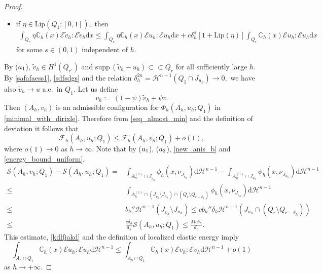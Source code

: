 \documentclass[reqno]{amsart}
\numberwithin{equation}{section}
\theoremstyle{plain}
\theoremstyle{definition}
\newcommand{\C}{\mathbb{C}}
\newcommand{\cH}{\mathcal{H}}
\newcommand{\cS}{\mathcal{S}}
\newcommand{\cF}{\mathcal{F}}
\renewcommand{\d}{\mathrm{d}}
\newcommand{\strictlyincluded}{\subset\subset}
\renewcommand{\tilde}{\widetilde}
\newcommand{\supp}{\mathrm{supp}\,}
\newcommand{\Lip}{\mathrm{Lip}}
\newcommand{\str}[1]{\mathcal{E}#1}
\begin{document}
\begin{proof}
\begin{itemize}
\item[($\rm a_4$)] if $\eta\in \Lip(Q_1;[0,1]),$ then 
\begin{align}\label{eta_constant}
\int_{Q_r} \eta \C_h(x)\str{\tilde v_h}:  \str{\tilde v_h}\d x \le
\int_{Q_r} \eta \C_h(x)\str{u_h}:\str{u_h} \d x
+
c\delta_h^s[1+\Lip(\eta)]\int_{Q_r} \C_h(x)\str{u_h}:\str{u_h}\d x 
\end{align}
for some $s\in(0,1)$ independent of $h.$ 
\end{itemize}
%
By ($\rm a_1$), $\tilde v_h\in H^1 (Q_{r'} )$ and $\supp(\tilde v_h - u_h)\strictlyincluded Q_r$ for all sufficiently  large $h.$
By \eqref{safafaess1}, \eqref{sdfsdgs} and the relation $\delta_h^{2n}=\cH^{n-1}(Q_1\cap J_{u_h})\to0,$ we have also
$\tilde v_h\to u$ a.e.\  in $Q_1.$  Let us define
\begin{equation}\label{wdsaw}
v_h:=(1-\psi) \tilde v_h+ \psi v. 
\end{equation}
%
Then $(A_h,v_h)$ is an admissible configuration for $\Phi_h(A_h,u_h;Q_1)$ in  \eqref{minimal_with_dirixle}. Therefore from \eqref{seq_almost_min} and the definition of deviation it follows that 
\begin{equation}\label{kdlfjakd}
\cF_h(A_h,u_h;Q_1) \le \cF_h(A_h,v_h;Q_1) + o(1), 
\end{equation}
%
where $o(1)\to0$ as $h\to\infty.$ Note that 
by ($\rm a_1$), ($\rm a_2$),  \eqref{new_anis_b} and \eqref{energy_bound_uniform},
%
\begin{align*}
\cS(A_h,v_h;Q_1) -\cS(A_h,u_h;Q_1)
= & \int_{A_h^{(1)}\cap J_{\tilde v_h}} \phi_h(x,\nu_{J_{\tilde v_h}}^{})\d\cH^{n-1} -  \int_{A_h^{(1)}\cap J_{u_h}}   \phi_h(x,\nu_{J_{u_h}}^{})\d\cH^{n-1}\\
\le & \int_{A_h^{(1)}\cap (J_{\tilde v_h}\setminus J_{u_h})\cap (Q_r\setminus Q_{r-\delta_h})} \phi_h(x,\nu_{J_{\tilde v_h}}^{})\d\cH^{n-1} \\
\le & b_h'' \cH^{n-1}(J_{\tilde v_h}\setminus J_{u_h}) \le  cb_h''\delta_h \cH^{n-1}(J_{u_h}\cap (Q_r\setminus Q_{r-\delta_h})) \\
\le & \frac{c\delta_h}{d_5} \cS(A_h,u_h;Q_1) \le \frac{Mc \delta_h}{d_5}.
\end{align*}
This estimate, \eqref{kdlfjakd} and the definition of localized elastic energy imply
%
\begin{equation}\label{almost_minimality_of_u_h}
\int_{A_h\cap Q_1} \C_h(x)\str{u_h}:\str{u_h}\d\cH^{n-1} \le 
\int_{A_h\cap Q_1} \C_h(x)\str{v_h}:\str{v_h}\d\cH^{n-1} + o(1)
\end{equation}
%
as $h\to+\infty.$


\end{proof}
\end{document}
